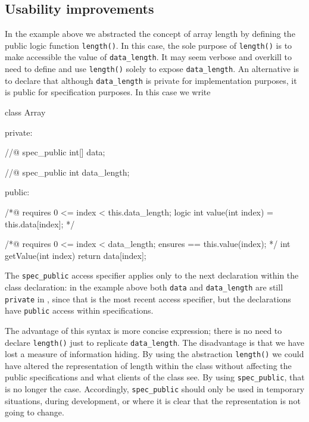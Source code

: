 \subsection{Usability improvements}

In the example above we abstracted the concept of array length by defining the public logic function \lstinline|length()|. 
In this case, the sole purpose of \lstinline|length()| is to make accessible the value of \lstinline|data_length|. It may seem verbose and overkill to need to define and use \lstinline|length()|  solely to expose \lstinline|data_length|. An alternative is to declare
that although \lstinline|data_length| is private for \lang{} implementation purposes, it is public for specification purposes.
In this case we write

\begin{listing-nonumber}
class Array {
	
  private:
	
    //@ spec_public
  	int[] data;
	
    //@ spec_public
	int data_length;
	
  public:
	
	/*@
	   requires 0 <= index < this.data_length;
	   logic int value(int index) = this.data[index]; 
	*/
	
	/*@ 
	   requires 0 <= index < data_length;
	   ensures \result == this.value(index);
	*/
	int getValue(int index) {
		return data[index];
	}	
}
\end{listing-nonumber}

The \lstinline|spec_public| access specifier applies only to the next declaration within the class declaration: in the example above both
\lstinline|data| and \lstinline|data_length| are still 
\lstinline|private| in \lang{}, since that is the most recent \lang{} access specifier, but the declarations have \lstinline|public| access within specifications. 

The advantage of this syntax is more concise expression; there is no need to declare \lstinline|length()| just to replicate \lstinline|data_length|.
The disadvantage is that we have lost a measure of information hiding. By using the abstraction \lstinline|length()| we could
have altered the representation of length within the class without affecting the public specifications and what clients of the class see.
By using \lstinline|spec_public|, that is no longer the case.
Accordingly, \lstinline|spec_public| should only be used in temporary situations, during development, or where it is clear that the representation is not going to change.

